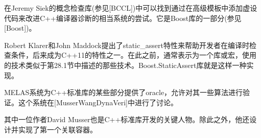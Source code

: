 在Jeremy Siek的概念检查库(参见[BCCL])中可以找到通过在高级模板中添加虚设代码来改进C++编译器诊断的相当系统的尝试。它是Boost库的一部分(参见[Boost])。

Robert Klarer和John Maddock提出了static\_assert特性来帮助开发者在编译时检查条件，后来成为C++11的特性之一。在此之前，通常表示为一个库或宏，使用的技术类似于第28.1节中描述的那些技术。Boost.StaticAssert库就是这样一种实现。

MELAS系统为C++标准库的某些部分提供了oracle，允许对其一些算法进行验证。这个系统在[MusserWangDynaVeri]中进行了讨论。

\begin{tcolorbox}[colback=webgreen!5!white,colframe=webgreen!75!black]
\hspace*{0.75cm}其中一位作者David Musser也是C++标准库开发的关键人物。除此之外，他还设计并实现了第一个关联容器。
\end{tcolorbox}
